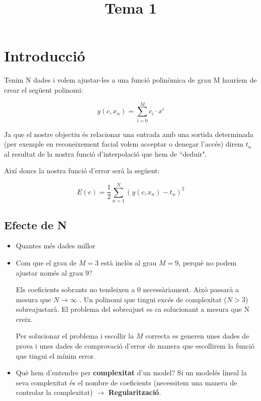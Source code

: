 \documentclass[a4paper]{article}
\begin{document}
	
\title{Tema 1}
\maketitle

\section{Introducció}

Tenim N dades i volem ajustar-les a una funció polinòmica de grau M hauríem de crear el següent polinomi:

\[ y(c, x_n) = \sum_{i=0}^{M} c_i·x^i \]

Ja que el nostre objectiu és relacionar una entrada amb una sortida determinada (per exemple en reconeixement facial volem acceptar o denegar l'accés) direm $t_n$ al resultat de la nostra funció d'interpolació que hem de ``deduir".

Així doncs la nostra funció d'error serà la següent:

\[ E(c) = \frac{1}{2} \sum_{n=1}^N (y(c, x_n) - t_n)^2 \]

\subsection{Efecte de N}

\begin{itemize}
	\item Quantes més dades millor
	\item Com que el grau de $M=3$ està inclòs al grau $M=9$, perquè no podem ajustar només al grau 9?
	
	Els coeficients sobrants no tendeixen a 0 necessàriament. Això passarà a mesura que $N \rightarrow \infty$ . Un polinomi que tingui excés de complexitat ($N > 3$) sobreajustarà. El problema del sobreajust es ca solucionant a mesura que N creix.
	
	Per solucionar el problema i escollir la $M$ correcta es generen unes dades de prova i unes dades de comprovació d'error de manera que escollirem la funció que tingui el mínim error.
	
	
	\item Què hem d'entendre per \textbf{complexitat } d'un model? Si un modelés lineal la seva complexitat és el nombre de coeficients (necessitem una manera de controlar la complexitat) $\rightarrow$ \textbf{Regularització}.
\end{itemize}
\end{document}
